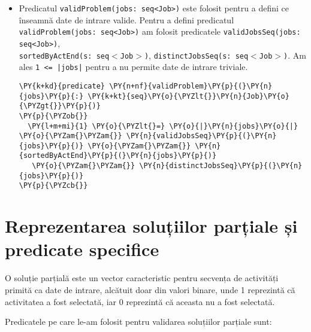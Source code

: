 \begin{itemize}
\begin{Verbatim}[commandchars=\\\{\}, fontsize=\footnotesize]
\PY{p}{\PYZcb{}}
\end{Verbatim}
\item Predicatul \texttt{validProblem(jobs: seq<Job>)} este folosit pentru a defini ce înseamnă date de intrare valide. Pentru a defini predicatul \texttt{validProblem(jobs: seq<Job>)} am folosit predicatele \texttt{validJobsSeq(jobs: seq<Job>)}, \\\texttt{sortedByActEnd(s: seq$<$Job$>$)}, \texttt{distinctJobsSeq(s: seq$<$Job$>$)}. Am ales \texttt{1 <= |jobs|} pentru a nu permite date de intrare triviale. 

\begin{Verbatim}[commandchars=\\\{\}, fontsize=\footnotesize]
    \PY{k+kd}{predicate} \PY{n+nf}{validProblem}\PY{p}{(}\PY{n}{jobs}\PY{p}{:} \PY{k+kt}{seq}\PY{o}{\PYZlt{}}\PY{n}{Job}\PY{o}{\PYZgt{}}\PY{p}{)}
\PY{p}{\PYZob{}}
  \PY{l+m+mi}{1} \PY{o}{\PYZlt{}=} \PY{o}{|}\PY{n}{jobs}\PY{o}{|} \PY{o}{\PYZam{}\PYZam{}} \PY{n}{validJobsSeq}\PY{p}{(}\PY{n}{jobs}\PY{p}{)} \PY{o}{\PYZam{}\PYZam{}} \PY{n}{sortedByActEnd}\PY{p}{(}\PY{n}{jobs}\PY{p}{)}
   \PY{o}{\PYZam{}\PYZam{}} \PY{n}{distinctJobsSeq}\PY{p}{(}\PY{n}{jobs}\PY{p}{)}
\PY{p}{\PYZcb{}}
\end{Verbatim}
\end{itemize}



\section{Reprezentarea soluțiilor parțiale și predicate specifice}

O soluție parțială este un vector caracteristic pentru secvența de activități primită ca date de intrare, alcătuit doar din valori binare, unde 1 reprezintă că activitatea a fost selectată, iar 0 reprezintă că aceasta nu a fost selectată. 

Predicatele pe care le-am folosit pentru validarea soluțiilor parțiale sunt: 

